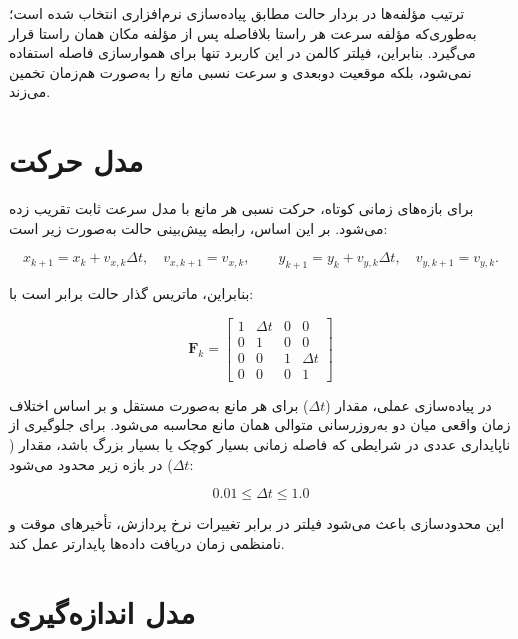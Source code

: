 ترتیب مؤلفه‌ها در بردار حالت مطابق پیاده‌سازی نرم‌افزاری انتخاب شده است؛ به‌طوری‌که مؤلفه سرعت هر راستا بلافاصله پس از مؤلفه مکان همان راستا قرار می‌گیرد. بنابراین، فیلتر کالمن در این کاربرد تنها برای هموارسازی فاصله استفاده نمی‌شود، بلکه موقعیت دوبعدی و سرعت نسبی مانع را به‌صورت هم‌زمان تخمین می‌زند.

\section{مدل حرکت}

برای بازه‌های زمانی کوتاه، حرکت نسبی هر مانع با مدل سرعت ثابت تقریب زده می‌شود. بر این اساس، رابطه پیش‌بینی حالت به‌صورت زیر است:

\begin{equation}
	x_{k+1}=x_k+v_{x,k}\Delta t,
	\quad
	v_{x,k+1}=v_{x,k},
	\qquad
	y_{k+1}=y_k+v_{y,k}\Delta t,
	\quad
	v_{y,k+1}=v_{y,k}.
\end{equation}

بنابراین، ماتریس گذار حالت برابر است با:

\begin{equation}
	\mathbf{F}_k =
	\begin{bmatrix}
		1 & \Delta t & 0 & 0 \\
		0 & 1        & 0 & 0 \\
		0 & 0        & 1 & \Delta t \\
		0 & 0        & 0 & 1
	\end{bmatrix}
	\label{eq:app_kalman_transition}
\end{equation}

در پیاده‌سازی عملی، مقدار ($\Delta t$) برای هر مانع به‌صورت مستقل و بر اساس اختلاف زمان واقعی میان دو به‌روزرسانی متوالی همان مانع محاسبه می‌شود. برای جلوگیری از ناپایداری عددی در شرایطی که فاصله زمانی بسیار کوچک یا بسیار بزرگ باشد، مقدار ($\Delta t$) در بازه زیر محدود می‌شود:

\begin{equation}
	0.01 \leq \Delta t \leq 1.0
	\label{eq:app_kalman_dt_clip}
\end{equation}

این محدودسازی باعث می‌شود فیلتر در برابر تغییرات نرخ پردازش، تأخیرهای موقت و نامنظمی زمان دریافت داده‌ها پایدارتر عمل کند.

\section{مدل اندازه‌گیری}

